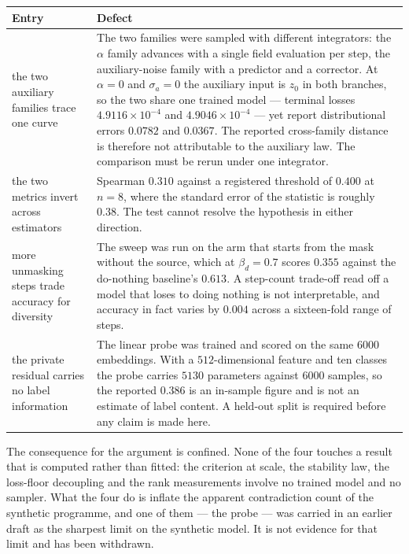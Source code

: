 \documentclass[11pt]{article}
\begin{document}
\begin{center}
\begin{tabular}{@{}p{}p{}@{}}
\toprule
Entry & Defect\\
\midrule
the two auxiliary families trace one curve &
The two families were sampled with different integrators: the $\alpha$ family advances with a
single field evaluation per step, the auxiliary-noise family with a predictor and a corrector. At
$\alpha=0$ and $\sigma_a=0$ the auxiliary input is $z_0$ in both branches, so the two share one
trained model --- terminal losses $4.9116\times10^{-4}$ and $4.9046\times10^{-4}$ --- yet report
distributional errors $0.0782$ and $0.0367$. The reported cross-family distance is therefore not
attributable to the auxiliary law. The comparison must be rerun under one integrator.\\
\addlinespace
the two metrics invert across estimators &
Spearman $0.310$ against a registered threshold of $0.400$ at $n=8$, where the standard error of
the statistic is roughly $0.38$. The test cannot resolve the hypothesis in either direction.\\
\addlinespace
more unmasking steps trade accuracy for diversity &
The sweep was run on the arm that starts from the mask without the source, which at
$\beta_d=0.7$ scores $0.355$ against the do-nothing baseline's $0.613$. A step-count trade-off
read off a model that loses to doing nothing is not interpretable, and accuracy in fact varies by
$0.004$ across a sixteen-fold range of steps.\\
\addlinespace
the private residual carries no label information &
The linear probe was trained and scored on the same $6000$ embeddings. With a $512$-dimensional
feature and ten classes the probe carries $5130$ parameters against $6000$ samples, so the
reported $0.386$ is an in-sample figure and is not an estimate of label content. A held-out split
is required before any claim is made here.\\
\bottomrule
\end{tabular}
\end{center}

The consequence for the argument is confined. None of the four touches a result that is computed
rather than fitted: the criterion at scale, the stability law, the loss-floor decoupling and the
rank measurements involve no trained model and no sampler. What the four do is inflate the
apparent contradiction count of the synthetic programme, and one of them --- the probe --- was
carried in an earlier draft as the sharpest limit on the synthetic model. It is not evidence for
that limit and has been withdrawn.
\end{document}
